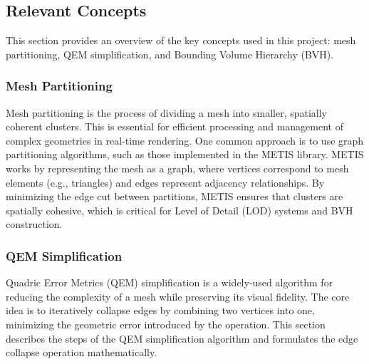 \documentclass[12pt]{extarticle}
\begin{document}
\subsection{Relevant Concepts}

This section provides an overview of the key concepts used in this project: mesh partitioning, QEM simplification, and Bounding Volume 
Hierarchy (BVH).

\subsubsection{Mesh Partitioning}
Mesh partitioning is the process of dividing a mesh into smaller, spatially coherent clusters. This is essential for efficient processing
and management of complex geometries in real-time rendering. One common approach is to use graph partitioning algorithms, such as 
those implemented in the METIS library. METIS works by representing the mesh as a graph, where vertices correspond to mesh elements 
(e.g., triangles) and edges represent adjacency relationships. By minimizing the edge cut between partitions, METIS ensures that 
clusters are spatially cohesive, which is critical for Level of Detail (LOD) systems and BVH construction.

\subsubsection{QEM Simplification}

Quadric Error Metrics (QEM) simplification is a widely-used algorithm for reducing the complexity of a mesh while preserving its 
visual fidelity. The core idea is to iteratively collapse edges by combining two vertices into one, minimizing the geometric error 
introduced by the operation. This section describes the steps of the QEM simplification algorithm and formulates the edge collapse 
operation mathematically.
\end{document}
